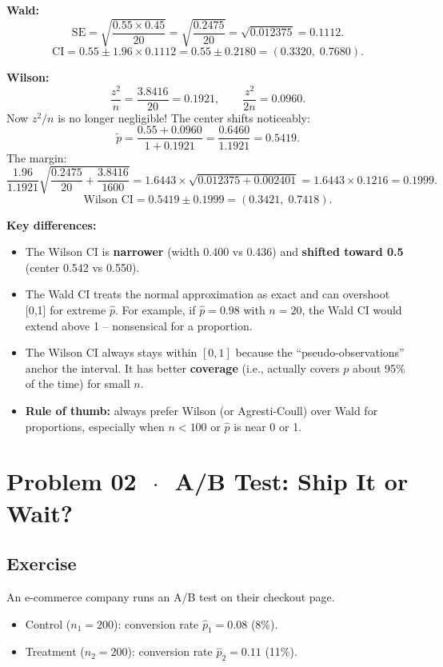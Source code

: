 \documentclass[11pt]{article}
\newcommand{\phat}{\hat{p}}
\begin{document}
\textbf{Wald:}
\[
  \text{SE} = \sqrt{\frac{0.55 \times 0.45}{20}} = \sqrt{\frac{0.2475}{20}} = \sqrt{0.012375} = 0.1112.
\]
\[
  \text{CI} = 0.55 \pm 1.96 \times 0.1112 = 0.55 \pm 0.2180 = \boxed{(0.3320,\; 0.7680)}.
\]

\textbf{Wilson:}
\[
  \frac{z^2}{n} = \frac{3.8416}{20} = 0.1921, \qquad \frac{z^2}{2n} = 0.0960.
\]
Now $z^2/n$ is no longer negligible! The center shifts noticeably:
\[
  \tilde{p} = \frac{0.55 + 0.0960}{1 + 0.1921} = \frac{0.6460}{1.1921} = 0.5419.
\]
The margin:
\[
  \frac{1.96}{1.1921}\sqrt{\frac{0.2475}{20} + \frac{3.8416}{1600}}
  = 1.6443 \times \sqrt{0.012375 + 0.002401}
  = 1.6443 \times 0.1216
  = 0.1999.
\]
\[
  \text{Wilson CI} = 0.5419 \pm 0.1999 = \boxed{(0.3421,\; 0.7418)}.
\]

\textbf{Key differences:}
\begin{itemize}
  \item The Wilson CI is \textbf{narrower} (width 0.400 vs 0.436) and \textbf{shifted toward 0.5} (center 0.542 vs 0.550).
  \item The Wald CI treats the normal approximation as exact and can overshoot [0,1] for extreme $\phat$. For example, if $\phat = 0.98$ with $n = 20$, the Wald CI would extend above 1 -- nonsensical for a proportion.
  \item The Wilson CI always stays within $[0, 1]$ because the ``pseudo-observations'' anchor the interval. It has better \textbf{coverage} (i.e., actually covers $p$ about 95\% of the time) for small $n$.
  \item \textbf{Rule of thumb:} always prefer Wilson (or Agresti-Coull) over Wald for proportions, especially when $n < 100$ or $\phat$ is near 0 or 1.
\end{itemize}

\section*{Problem 02 \texorpdfstring{$\,\cdot\,$}{-} A/B Test: Ship It or Wait?}

\subsection*{Exercise}

An e-commerce company runs an A/B test on their checkout page.

\begin{itemize}
  \item Control ($n_1 = 200$): conversion rate $\hat{p}_1 = 0.08$ (8\%).
  \item Treatment ($n_2 = 200$): conversion rate $\hat{p}_2 = 0.11$ (11\%).
\end{itemize}
\end{document}
